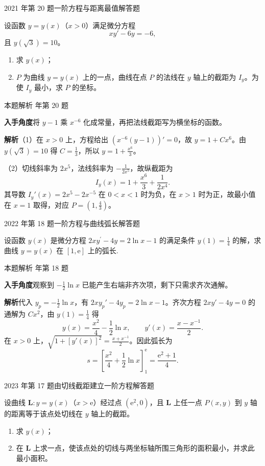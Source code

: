 \documentclass[UTF8,zihao=-4,fontset=fandol]{ctexart}
\newcommand{\QuestionPage}[6]{%
  \par\noindent\begin{minipage}{\linewidth}
  \raggedright
  {\small\textcolor{black!60}{#3\quad #5}\hfill\textcolor{accent}{#2}}\par\smallskip}
\newcommand{\QuestionEnd}{\end{minipage}\par\medskip}
\newcommand{\QuestionPage}[6]{%
  \clearpage
  {\small\textcolor{accent}{#1\hfill #2}}\par\medskip
  {\small\textcolor{black!60}{#3\quad #5\hfill #6}}\par\vspace{9bp}}
\newcommand{\QuestionEnd}{}
\newenvironment{QuestionSolution}[1]{%
  \clearpage
  {\small\textcolor{black!60}{本题解析\quad #1}}\par\medskip
}{\par\clearpage}
\begin{document}
\QuestionPage{4.1 几类简单的微分方程}{解答题}{2021 年第 20 题}{3}{一阶方程与距离最值}{215 / 234}
设函数 \(y=y(x)\)（\(x>0\)）满足微分方程
\[xy'-6y=-6,
\]
且 \(y\left(\sqrt{3}\right)=10\)。
\begin{enumerate}
\item 求 \(y(x)\)；
\item \(P\) 为曲线 \(y=y(x)\) 上的一点，曲线在点 \(P\) 的法线在 \(y\) 轴上的截距为 \(I_y\)。为使 \(I_y\) 最小，求 \(P\) 的坐标。
\end{enumerate}
\QuestionEnd

\begin{QuestionSolution}{2021 年第 20 题}
\textbf{入手角度}\quad 将 \(y-1\) 乘 \(x^{-6}\) 化成常量，再把法线截距写为横坐标的函数。

\textbf{解析}\quad （1）在 \(x>0\) 上，方程给出 \((x^{-6}(y-1))'=0\)，故 \(y=1+Cx^6\)。由 \(y(\sqrt3)=10\) 得 \(C=\frac{1}{3}\)，所以 \(\boxed{y=1+\frac{x^6}{3}}\)。

（2）切线斜率为 \(2x^5\)，法线斜率为 \(-\frac{1}{2x^5}\)，故纵截距为
\[
I_y(x)=1+\frac{x^6}{3}+\frac1{2x^4}.
\]
其导数 \(I_y'(x)=2x^5-2x^{-5}\) 在 \(0<x<1\) 时为负，在 \(x>1\) 时为正，故最小值在 \(x=1\) 取得，对应 \(\boxed{P=(1,\frac{4}{3})}\)。
\end{QuestionSolution}

\QuestionPage{4.1 几类简单的微分方程}{解答题}{2022 年第 18 题}{3}{一阶方程与曲线弧长}{216 / 234}
设函数 \(y\left( x \right)\) 是微分方程
\(2x y^{\prime} - 4y = 2\ln x - 1\)
的满足条件
\(y\left( 1 \right) = \frac{1}{4}\)
的解，求曲线 \(y = y\left( x \right)\) 在 \(\left[ 1,\mathrm{e} \right]\) 上的弧长.
\QuestionEnd

\begin{QuestionSolution}{2022 年第 18 题}
\textbf{入手角度}\quad 观察到 \(-\tfrac12\ln x\) 已能产生右端非齐次项，剩下只需求齐次通解。

\textbf{解析}\quad 代入 \(y_p=-\tfrac12\ln x\)，有 \(2xy_p'-4y_p=2\ln x-1\)。齐次方程 \(2xy'-4y=0\) 的通解为 \(Cx^2\)，由 \(y(1)=\frac{1}{4}\) 得
\[
y(x)=\frac{x^2}{4}-\frac12\ln x,\qquad
y'(x)=\frac{x-x^{-1}}{2}.
\]
在 \(x>0\) 上，\(\sqrt{1+[y'(x)]^2}=\frac{x+x^{-1}}{2}\)。因此弧长为
\[
s=\left[\frac{x^2}{4}+\frac12\ln x\right]_1^{\mathrm{e}}
=\boxed{\frac{\mathrm{e}^2+1}{4}}.
\]
\end{QuestionSolution}

\QuestionPage{4.1 几类简单的微分方程}{解答题}{2023 年第 17 题}{3}{由切线截距建立一阶方程}{217 / 234}
设曲线 \(\boldsymbol L:y=y(x)\)（\(x>\mathrm{e}\)）经过点 \((\mathrm{e}^2,0)\)，且 \(\boldsymbol L\) 上任一点 \(P(x,y)\) 到 \(y\) 轴的距离等于该点处切线在 \(y\) 轴上的截距。
\begin{enumerate}
\item 求 \(y(x)\)；
\item 在 \(\boldsymbol L\) 上求一点，使该点处的切线与两坐标轴所围三角形的面积最小，并求此最小面积。
\end{enumerate}
\QuestionEnd
\end{document}
